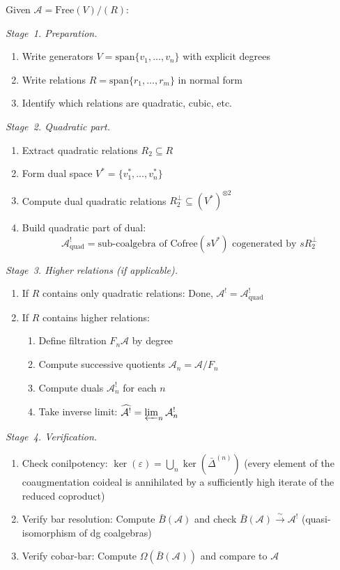 \begin{procedure}\label{proc:compute-koszul-dual}
Given $\mathcal{A} = \text{Free}(V) / (R)$:

\emph{Stage~1. Preparation.}
\begin{enumerate}
\item Write generators $V = \text{span}\{v_1, \ldots, v_n\}$ with explicit degrees
\item Write relations $R = \text{span}\{r_1, \ldots, r_m\}$ in normal form
\item Identify which relations are quadratic, cubic, etc.
\end{enumerate}

\emph{Stage~2. Quadratic part.}
\begin{enumerate}
\item Extract quadratic relations $R_2 \subseteq R$
\item Form dual space $V^* = \{v_1^*, \ldots, v_n^*\}$
\item Compute dual quadratic relations $R_2^\perp \subseteq (V^*)^{\otimes 2}$
\item Build quadratic part of dual:
      \[\mathcal{A}^!_{\text{quad}} = \text{sub-coalgebra of } \text{Cofree}(sV^*) \text{ cogenerated by } sR_2^\perp\]
\end{enumerate}

\emph{Stage~3. Higher relations (if applicable).}
\begin{enumerate}
\item If $R$ contains only quadratic relations: Done, $\mathcal{A}^! = \mathcal{A}^!_{\text{quad}}$
\item If $R$ contains higher relations:
   \begin{enumerate}
   \item Define filtration $F_n\mathcal{A}$ by degree
   \item Compute successive quotients $\mathcal{A}_n = \mathcal{A} / F_n$
   \item Compute duals $\mathcal{A}_n^!$ for each $n$
   \item Take inverse limit: $\widehat{\mathcal{A}^!} = \varprojlim_n \mathcal{A}_n^!$
   \end{enumerate}
\end{enumerate}

\emph{Stage~4. Verification.}
\begin{enumerate}
\item Check conilpotency: $\ker(\varepsilon) = \bigcup_n \ker(\bar{\Delta}^{(n)})$ (every element of the coaugmentation coideal is annihilated by a sufficiently high iterate of the reduced coproduct)
\item Verify bar resolution: Compute $\bar{B}(\mathcal{A})$ and check $\bar{B}(\mathcal{A}) \xrightarrow{\sim} \mathcal{A}^!$ (quasi-isomorphism of dg coalgebras)
\item Verify cobar-bar: Compute $\Omega(\bar{B}(\mathcal{A}))$ and compare to $\mathcal{A}$
\end{enumerate}
\end{procedure}

